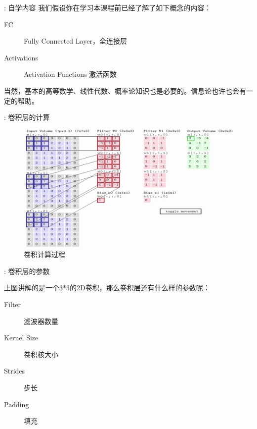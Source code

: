 \begin{frame}{\titleprefix: 自学内容}
	\alert{我们假设你在学习本课程前已经了解了如下概念的内容：}
	
	\begin{description}
		\item[FC] Fully Connected Layer，全连接层
		\item[Activations] Activation Functions 激活函数
	\end{description}

	当然，基本的\alert{高等数学、线性代数、概率论}知识也是必要的。\alert{信息论}也许也会有一定的帮助。
\end{frame}

\begin{frame}{\titleprefix: 卷积层的计算}
	\begin{figure}
		\centering
		\includegraphics[width=\linewidth]{Images/conv_1}
		\caption{卷积计算过程}
		\label{fig:conv1}
	\end{figure}
	
\end{frame}

\begin{frame}{\titleprefix: 卷积层的参数}
	
	上图讲解的是一个3*3的2D卷积，那么卷积层还有什么样的参数呢：
	\begin{description}
		\item[Filter] 滤波器数量
		\item[Kernel Size] 卷积核大小
		\item[Strides] 步长
		\item[Padding] 填充
	\end{description}
	
\end{frame}

